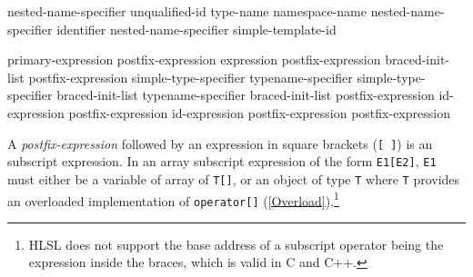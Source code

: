 
\begin{grammar}
  \br
  nested-name-specifier  unqualified-id\br
  \br
  \terminal{::}\br
  type-name \terminal{::}\br
  namespace-name \terminal{::}\br
  nested-name-specifier identifier \terminal{::}\br
  nested-name-specifier  simple-template-id \terminal{::}
\end{grammar}


\begin{grammar}
  \br
  primary-expression\br
  postfix-expression \terminal{[} expression \terminal{]}\br
  postfix-expression \terminal{[} braced-init-list \terminal{]}\br
  postfix-expression \terminal{(}  \terminal{)}\br
  simple-type-specifier \terminal{(}  \terminal{)}\br
  typename-specifier \terminal{(}  \terminal{)}\br
  simple-type-specifier braced-init-list\br
  typename-specifier braced-init-list\br
  postfix-expression   id-expression\br
  postfix-expression \terminal{->}  id-expression\br
  postfix-expression \terminal{++}\br
  postfix-expression \terminal{--}
\end{grammar}


\p A \textit{postfix-expression} followed by an expression in square brackets
(\texttt{[ ]}) is an subscript expression. In an array subscript expression
of the form \texttt{E1[E2]}, \texttt{E1} must either be a variable of array of
\texttt{T[]}, or an object of type \texttt{T} where \texttt{T} provides an
overloaded implementation of \texttt{operator[]} (\ref{Overload}).\footnote{HLSL
does not support the base address of a subscript operator being the expression
inside the braces, which is valid in C and C++.}
